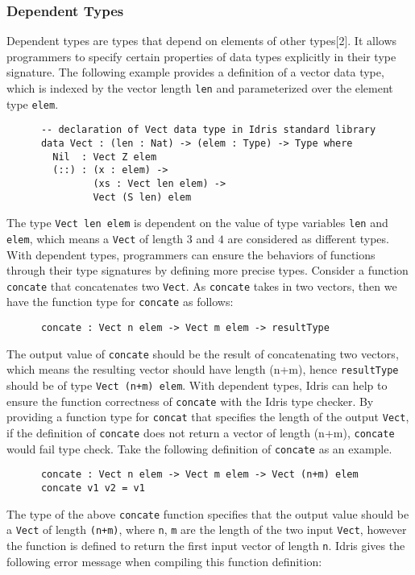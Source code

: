 \subsubsection*{Dependent Types}
Dependent types are types that depend on elements of other types[2]. It allows programmers to specify certain properties of data types explicitly in their type signature. The following example provides a definition of a vector data type, which is indexed by the vector length \texttt{len} and parameterized over the element type \texttt{elem}.
\begin{lstlisting}
      -- declaration of Vect data type in Idris standard library
      data Vect : (len : Nat) -> (elem : Type) -> Type where
        Nil  : Vect Z elem
        (::) : (x : elem) -> 
               (xs : Vect len elem) -> 
               Vect (S len) elem
\end{lstlisting}
The type \texttt{Vect len elem} is dependent on the value of type variables \texttt{len} and \texttt{elem}, which means a \texttt{Vect} of length $3$ and $4$ are considered as different types. With dependent types, programmers can ensure the behaviors of functions through their type signatures by defining more precise types. Consider a function \texttt{concate} that concatenates two \texttt{Vect}. As \texttt{concate} takes in two vectors, then we have the function type for \texttt{concate} as follows: 
\begin{lstlisting}
      concate : Vect n elem -> Vect m elem -> resultType
\end{lstlisting}
The output value of \texttt{concate} should be the result of concatenating two vectors, which means the resulting vector should have length (n+m), hence \texttt{resultType} should be of type \texttt{Vect (n+m) elem}. With dependent types, Idris can help to ensure the function correctness of \texttt{concate} with the Idris type checker. By providing a function type for \texttt{concat} that specifies the length of the output \texttt{Vect}, if the definition of \texttt{concate} does not return a vector of length (n+m), \texttt{concate} would fail type check. Take the following definition of \texttt{concate} as an example. 
\begin{lstlisting}
      concate : Vect n elem -> Vect m elem -> Vect (n+m) elem
      concate v1 v2 = v1
\end{lstlisting}
The type of the above \texttt{concate} function specifies that the output value should be a \texttt{Vect} of length \texttt{(n+m)}, where \texttt{n}, \texttt{m} are the length of the two input \texttt{Vect}, however the function is defined to return the first input vector of length \texttt{n}. Idris gives the following error message when compiling this function definition: 
